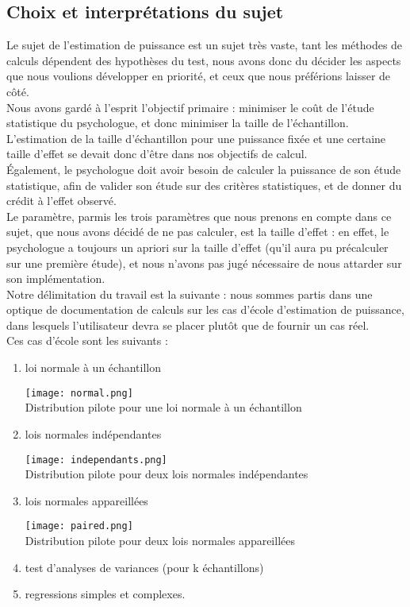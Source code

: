 \documentclass[a4paper,11pt]{article}
\begin{document}
\subsection{Choix et interprétations du sujet}
Le sujet de l'estimation de puissance est un sujet très vaste, tant les méthodes de calculs dépendent des hypothèses du test, nous avons donc du décider les aspects que nous voulions développer en priorité, et ceux que nous préférions laisser de côté.\\
Nous avons gardé à l'esprit l'objectif primaire : minimiser le coût de l'étude statistique du psychologue, et donc minimiser la taille de l'échantillon. L'estimation de la taille d'échantillon pour une puissance fixée et une certaine taille d'effet se devait donc d'être dans nos objectifs de calcul.\\
Également, le psychologue doit avoir besoin de calculer la puissance de son étude statistique, afin de valider son étude sur des critères statistiques, et de donner du crédit à l'effet observé.\\
Le paramètre, parmis les trois paramètres que nous prenons en compte dans ce sujet, que nous avons décidé de ne pas calculer, est la taille d'effet : en effet, le psychologue a toujours un apriori sur la taille d'effet (qu'il aura pu précalculer sur une première étude), et nous n'avons pas jugé nécessaire de nous attarder sur son implémentation.\\
Notre délimitation du travail est la suivante : nous sommes partis dans une optique de documentation de calculs sur les cas d'école d'estimation de puissance, dans lesquels l'utilisateur devra se placer plutôt que de fournir un cas réel. \\
Ces cas d'école sont les suivants : 
\begin{enumerate}
\item loi normale à un échantillon
\begin{center}
\texttt{[image: normal.png]}\\
Distribution pilote pour une loi normale à un échantillon
\end{center}
\item lois normales indépendantes
\begin{center}
\texttt{[image: independants.png]}\\
Distribution pilote pour deux lois normales indépendantes
\end{center}
\item lois normales appareillées
\begin{center}
\texttt{[image: paired.png]}\\
Distribution pilote pour deux lois normales appareillées
\end{center}
\item test d'analyses de variances (pour k échantillons)
\item regressions simples et complexes.
\end{enumerate}
\end{document}
